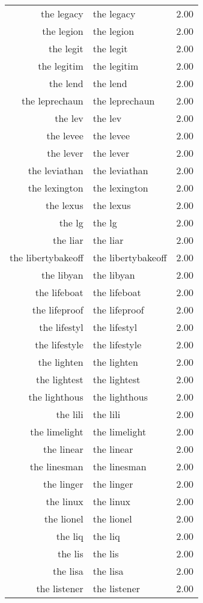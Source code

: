 \begin{table}[ht]
\begin{tabular}{rlr}
  the legacy & the legacy & 2.00 \\ 
  the legion & the legion & 2.00 \\ 
  the legit & the legit & 2.00 \\ 
  the legitim & the legitim & 2.00 \\ 
  the lend & the lend & 2.00 \\ 
  the leprechaun & the leprechaun & 2.00 \\ 
  the lev & the lev & 2.00 \\ 
  the levee & the levee & 2.00 \\ 
  the lever & the lever & 2.00 \\ 
  the leviathan & the leviathan & 2.00 \\ 
  the lexington & the lexington & 2.00 \\ 
  the lexus & the lexus & 2.00 \\ 
  the lg & the lg & 2.00 \\ 
  the liar & the liar & 2.00 \\ 
  the libertybakeoff & the libertybakeoff & 2.00 \\ 
  the libyan & the libyan & 2.00 \\ 
  the lifeboat & the lifeboat & 2.00 \\ 
  the lifeproof & the lifeproof & 2.00 \\ 
  the lifestyl & the lifestyl & 2.00 \\ 
  the lifestyle & the lifestyle & 2.00 \\ 
  the lighten & the lighten & 2.00 \\ 
  the lightest & the lightest & 2.00 \\ 
  the lighthous & the lighthous & 2.00 \\ 
  the lili & the lili & 2.00 \\ 
  the limelight & the limelight & 2.00 \\ 
  the linear & the linear & 2.00 \\ 
  the linesman & the linesman & 2.00 \\ 
  the linger & the linger & 2.00 \\ 
  the linux & the linux & 2.00 \\ 
  the lionel & the lionel & 2.00 \\ 
  the liq & the liq & 2.00 \\ 
  the lis & the lis & 2.00 \\ 
  the lisa & the lisa & 2.00 \\ 
  the listener & the listener & 2.00 \\ 

\end{tabular}
\end{table}
